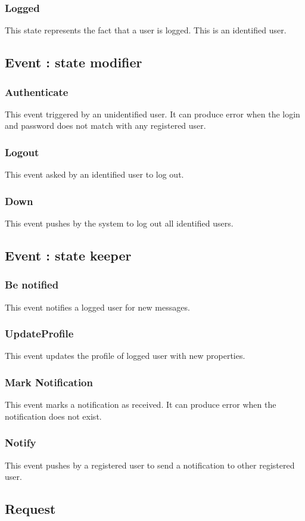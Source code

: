 		\subsubsection{Logged}
			This state represents the fact that a user is logged. This is an identified user.
	\subsection{Event : state modifier}
		\subsubsection{Authenticate}
			This event triggered by an unidentified user. It can produce error when the login and password does not match with any registered user.
		\subsubsection{Logout}
			This event asked by an identified user to log out.
		\subsubsection{Down}
			This event pushes by the system to log out all identified users.
	\subsection{Event : state keeper}
		\subsubsection{Be notified}
			This event notifies a logged user for new messages.
		\subsubsection{UpdateProfile}	
			This event updates the profile of logged user with new properties.
		\subsubsection{Mark Notification}
			This event marks a notification as received. It can produce error when the notification does not exist.
		\subsubsection{Notify}
			This event pushes by a registered user to send a notification to other registered user.
	\subsection{Request}
